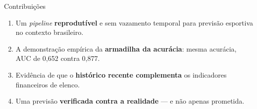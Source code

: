 \documentclass[aspectratio=169,11pt,t]{beamer}
\begin{document}
\begin{frame}{Contribuições}
    \vspace{0.6cm}
    \begin{enumerate}\itemsep0.7em
        \item[\textcolor{azul}{\textbf{1.}}] Um \emph{pipeline} \textbf{reprodutível} e sem
              vazamento temporal para previsão esportiva no contexto brasileiro.
        \item[\textcolor{azul}{\textbf{2.}}] A demonstração empírica da
              \textbf{armadilha da acurácia}: mesma acurácia, AUC de 0,652 contra 0,877.
        \item[\textcolor{azul}{\textbf{3.}}] Evidência de que o \textbf{histórico recente
              complementa} os indicadores financeiros de elenco.
        \item[\textcolor{verm}{\textbf{4.}}] Uma previsão \textbf{verificada contra a
              realidade} --- e não apenas prometida.
    \end{enumerate}
\end{frame}
\end{document}
